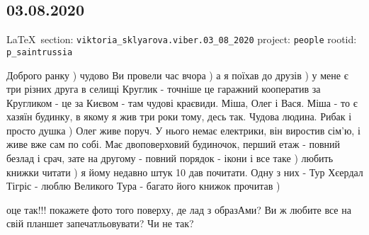  
 
\subsection{03.08.2020}
  
\vspace{0.5cm}
{\small\LaTeX~section: \verb|viktoria_sklyarova.viber.03_08_2020| project: \verb|people| rootid: \verb|p_saintrussia|}
\vspace{0.5cm}

Доброго ранку ) чудово Ви провели час вчора ) а я поїхав до друзів ) у мене є
три різних друга в селищі Круглик - точніше це гаражний кооператив за Кругликом
- це за Києвом - там чудові краєвиди. Міша, Олег і Вася. Міша - то є хазяїн
будинку, в якому я жив три роки тому, десь так. Чудова людина. Рибак і просто
душка ) Олег живе поруч. У нього немає електрики, він виростив сім'ю, і живе
вже сам по собі. Має двоповерховий будиночок, перший етаж - повний безлад і
срач, зате на другому - повний порядок - ікони і все таке ) любить книжки
читати ) я йому недавно штук 10 дав почитати. Одну з них - Тур Хєердал Тігріс -
люблю Великого Тура - багато його книжок прочитав )

оце так!!!
покажете фото того поверху, де лад з образАми? 
Ви ж любите все на свій планшет запечатльовувати? Чи не так?
  
